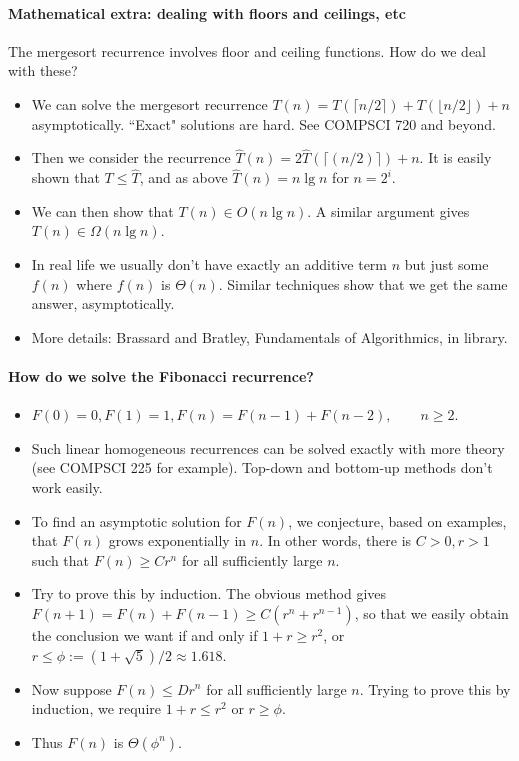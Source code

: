\paragraph{Mathematical extra: dealing with floors and ceilings, etc}
The mergesort recurrence involves floor and ceiling functions. How do we deal with these?
\begin{itemize}
\item We can solve the mergesort recurrence 
$T(n) = T(\lceil n/2 \rceil) + T(\lfloor n/2 \rfloor) + n$ asymptotically. 
``Exact" solutions are hard. See COMPSCI 720 and beyond.
\item Then we consider the recurrence $\hat{T}(n) =
2\hat{T}(\lceil(n/2)\rceil) + n$. It is easily shown that $T \leq \hat{T}$, and 
as above $\hat{T}(n) = n \lg n$ for $n = 2^i$.
\item We can then show that $T(n)
\in O(n \lg n)$. A similar argument gives $T(n) \in \Omega(n \lg n)$.
\item In real life we usually don't have exactly an additive term $n$
but just some $f(n)$ where $f(n)$ is $\Theta(n)$. Similar techniques show that 
we get the same answer, asymptotically. 
\item More details: Brassard and Bratley, Fundamentals of Algorithmics, 
in library.
\end{itemize}

\paragraph{How do we solve the Fibonacci recurrence?}
\begin{itemize}
\item $F(0) = 0, F(1) = 1, F(n) = F(n-1) + F(n-2), \qquad n \geq 2$.
\item Such linear homogeneous recurrences can be solved exactly with
more theory (see COMPSCI 225 for example).
Top-down and bottom-up methods don't work easily. 
\item To find an asymptotic solution for
$F(n)$, we conjecture, based on examples, that $F(n)$ grows
exponentially in $n$. In other words, there is $C > 0, r > 1$ such that 
$F(n) \geq C r^n$ for all sufficiently large $n$.
\item Try to prove this by induction. The obvious method gives 
$F(n+1) = F(n) + F(n-1) \geq C(r^n + r^{n-1})$, so that we easily obtain
the conclusion we want if and only if $1 + r \geq r^2$, or $r \leq
\phi:=(1 + \sqrt{5})/2 \approx 1.618$. 
\item Now suppose $F(n) \leq D
r^n$ for all sufficiently large $n$. Trying to prove this by induction,
we require $1 + r \leq r^2$ or $r \geq \phi$. 
\item Thus $F(n)$ is $\Theta(\phi^n)$.
\end{itemize}


